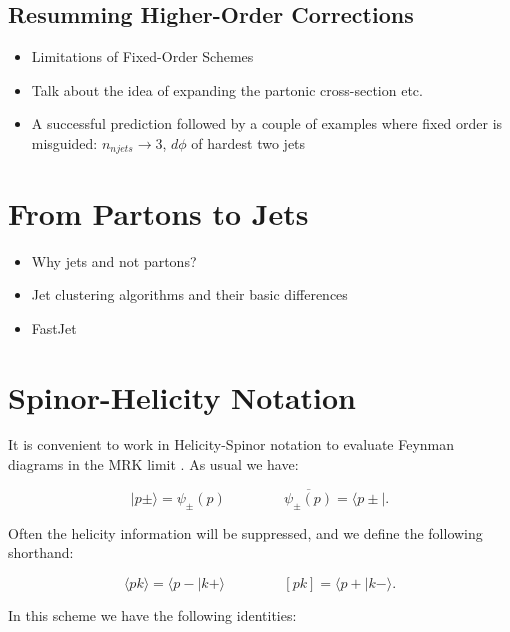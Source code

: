 	\subsection{Resumming Higher-Order Corrections}

	\begin{itemize}
		\item Limitations of Fixed-Order Schemes
		\item Talk about the idea of expanding the partonic cross-section etc.
		\item A successful prediction followed by a couple of examples where fixed
		      order is misguided: $n_{njets}\rightarrow3$, $d\phi$ of hardest two jets
	\end{itemize}

\section{From Partons to Jets}
	\label{sec:clustering}

	\begin{itemize}
		\item Why jets and not partons?
		\item Jet clustering algorithms and their basic differences
		\item FastJet
	\end{itemize}

\section{Spinor-Helicity Notation}
	\label{sec:SpinorHelicity}

	It is convenient to work in Helicity-Spinor notation to evaluate Feynman diagrams in the MRK limit \cite{efficiently}.  As usual we have:

	\begin{equation}
		\mid p\pm\rangle = \psi_\pm(p) \hspace{50pt} \overline{\psi_\pm(p)} = \langle p\pm\mid.
	\end{equation}

	Often the helicity information will be suppressed, and we define the following shorthand:

	\begin{equation}
		\langle pk\rangle = \langle p-\mid k+\rangle \hspace{50pt} [pk] = \langle p+\mid k-\rangle.
	\end{equation}

	In this scheme we have the following identities:

